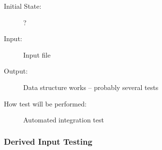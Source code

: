 \documentclass[12pt, titlepage]{article}
\begin{document}
\begin{addmargin}[2em]{0em}
\begin{addmargin}[2em]{0em}
\begin{description}
\item[Initial State:] ?
					
\item[Input:] Input file
					
\item[Output:] Data structure works -- probably several tests
					
\item[How test will be performed:] Automated integration test\\
\end{description}
\end{addmargin}		

\end{addmargin}



\subsubsection{Derived Input Testing}
\end{document}
